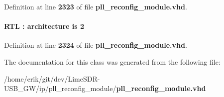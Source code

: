 Definition at line {\bf 2323} of file {\bf pll\+\_\+reconfig\+\_\+module.\+vhd}.

\paragraph[{synthesis\+\_\+clearbox}]{ {\bfseries \textcolor{vhdlchar}{R\+TL}\textcolor{vhdlchar}{ }\textcolor{vhdlchar}{\+:}\textcolor{vhdlchar}{ }\textcolor{keywordflow}{architecture}\textcolor{vhdlchar}{ }\textcolor{keywordflow}{is}\textcolor{vhdlchar}{ }\textcolor{vhdlchar}{ } \textcolor{vhdldigit}{2} \textcolor{vhdlchar}{ }} \hspace{0.3cm}{\ttfamily [Attribute]}}\label{classpll__reconfig__module_1_1RTL_ab7e19089512e7960b82570ec548a519c}


Definition at line {\bf 2324} of file {\bf pll\+\_\+reconfig\+\_\+module.\+vhd}.



The documentation for this class was generated from the following file\+:\begin{DoxyCompactItemize}
\item 
/home/erik/git/dev/\+Lime\+S\+D\+R-\/\+U\+S\+B\+\_\+\+G\+W/ip/pll\+\_\+reconfig\+\_\+module/{\bf pll\+\_\+reconfig\+\_\+module.\+vhd}\end{DoxyCompactItemize}
